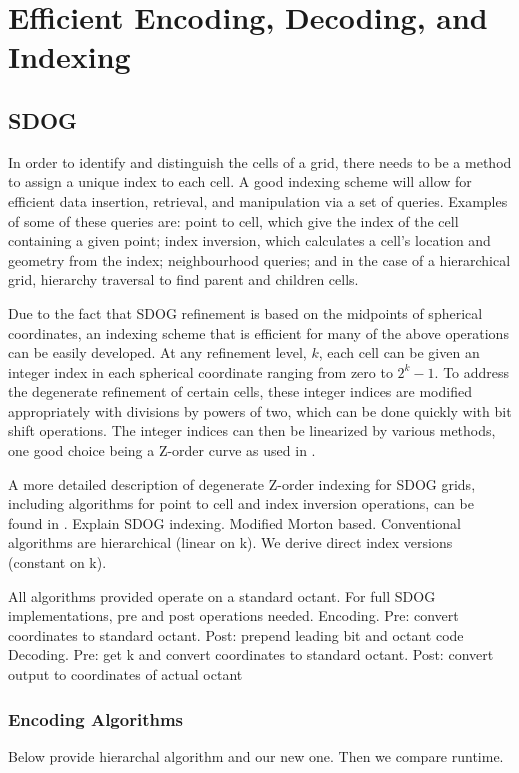 \chapter{Efficient Encoding, Decoding, and Indexing} \label{chap:coding}


\section{SDOG}
In order to identify and distinguish the cells of a grid, there needs to be a method to assign a unique index to each cell.
A good indexing scheme will allow for efficient data insertion, retrieval, and manipulation via a set of queries.
Examples of some of these queries are: point to cell, which give the index of the cell containing a given point; index inversion, which calculates a cell's location and geometry from the index; neighbourhood queries; and in the case of a hierarchical grid, hierarchy traversal to find parent and children cells.


Due to the fact that SDOG refinement is based on the midpoints of spherical coordinates, an indexing scheme that is efficient for many of the above operations can be easily developed.
At any refinement level, $k$, each cell can be given an integer index in each spherical coordinate ranging from zero to $2^{k} - 1$.
To address the degenerate refinement of certain cells, these integer indices are modified appropriately with divisions by powers of two, which can be done quickly with bit shift operations.
The integer indices can then be linearized by various methods, one good choice being a Z-order curve \cite{morton1966computer} as used in \cite{yu2009sdog}.


A more detailed description of degenerate Z-order indexing for SDOG grids, including algorithms for point to cell and index inversion operations, can be found in \cite{yu2009coding}.
Explain SDOG indexing.
Modified Morton based.
Conventional algorithms are hierarchical (linear on k).
We derive direct index versions (constant on k).


All algorithms provided operate on a standard octant. For full SDOG implementations, pre and post operations needed.
Encoding. Pre: convert coordinates to standard octant. Post: prepend leading bit and octant code
Decoding. Pre: get k and convert coordinates to standard octant. Post: convert output to coordinates of actual octant


\subsection{Encoding Algorithms}
Below provide hierarchal algorithm and our new one.
Then we compare runtime.


